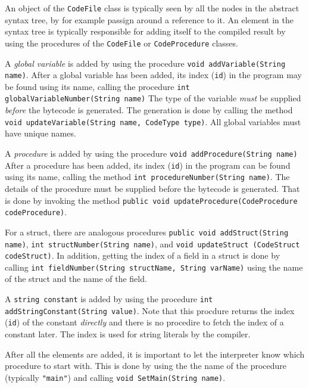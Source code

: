 \documentclass[11pt]{article}
\begin{document}
An object of the \texttt{CodeFile} class is typically seen by all the nodes in the
abstract syntax tree, by for example passign around a reference to it. An
element in the syntax tree is typically responsible for adding itself to
the compiled result by using the procedures of the \texttt{CodeFile} or
\texttt{CodeProcedure} classes.


A \emph{global variable} is added by using the procedure \texttt{void
addVariable(String name)}. After a global variable has been added, its
index (\texttt{id}) in the program may be found using its name, calling the
procedure \texttt{int globalVariableNumber(String name)} The type of the variable
\emph{must} be supplied \emph{before} the bytecode is generated. The generation is
done by calling the method \texttt{void updateVariable(String name, CodeType
type)}. All global variables must have unique names.


A \emph{procedure} is added by using the procedure \texttt{void addProcedure(String
name)} After a procedure has been added, its index (\texttt{id}) in the program
can be found using its name, calling the method \texttt{int procedureNumber(String
name)}. The details of the procedure must be supplied before the bytecode
is generated. That  is done by invoking the method \texttt{public void
updateProcedure(CodeProcedure codeProcedure)}.


For a struct, there are analogous procedures \texttt{public void addStruct(String
name)}, \texttt{int structNumber(String name)}, and \texttt{void updateStruct (CodeStruct
codeStruct)}.  In addition, getting the index of a field in a struct is
done by calling \texttt{int fieldNumber(String structName, String varName)} using
the name of the struct and the name of the field.

A \texttt{string constant} is added by using the procedure \texttt{int
addStringConstant(String value)}. Note that this procdure returns the index
(\texttt{id}) of the constant \emph{directly} and there is no procedire to fetch the
index of a constant later.  The index is used for string literals by the
compiler.


After all the elements are added, it is important to let the interpreter
know which procedure to start with. This is done by using the the name of
the procedure (typically \texttt{"main"}) and calling \texttt{void SetMain(String name)}.
\end{document}

